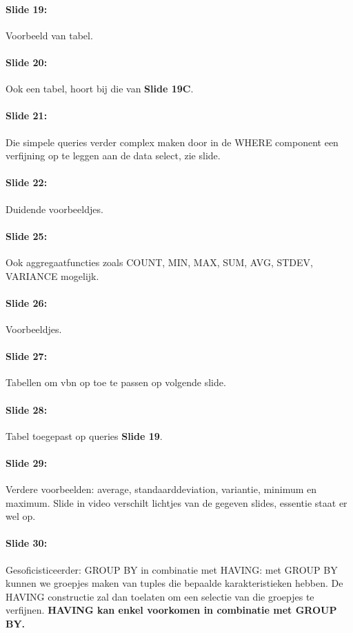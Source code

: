 \documentclass[10pt,a4paper]{report}
\begin{document}
\paragraph{Slide 19:}Voorbeeld van tabel.

\paragraph{Slide 20:}Ook een tabel, hoort bij die van \textbf{Slide 19C}.

\paragraph{Slide 21:}Die simpele queries verder complex maken door in de WHERE component een verfijning op te leggen aan de data select, zie slide.

\paragraph{Slide 22:}Duidende voorbeeldjes.

\paragraph{Slide 25:}Ook aggregaatfuncties zoals COUNT, MIN, MAX, SUM, AVG, STDEV, VARIANCE mogelijk.

\paragraph{Slide 26:}Voorbeeldjes.

\paragraph{Slide 27:}Tabellen om vbn op toe te passen op volgende slide.

\paragraph{Slide 28:}Tabel toegepast op queries \textbf{Slide 19}.

\paragraph{Slide 29:}Verdere voorbeelden: average, standaarddeviation, variantie, minimum en maximum. Slide in video verschilt lichtjes van de gegeven slides, essentie staat er wel op.

\paragraph{Slide 30:}Gesoficisticeerder: GROUP BY in combinatie met HAVING: met GROUP BY kunnen we groepjes maken van tuples die bepaalde karakteristieken hebben. De HAVING constructie zal dan toelaten om een selectie van die groepjes te verfijnen. \textbf{HAVING kan enkel voorkomen in combinatie met GROUP BY.}
\end{document}
